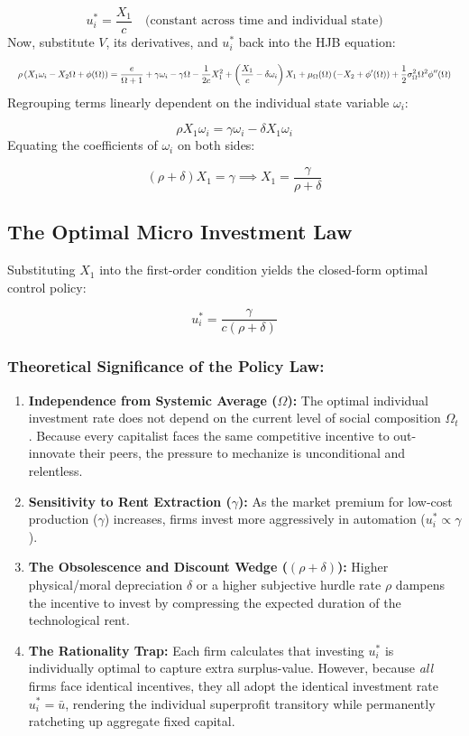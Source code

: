 \documentclass[11pt,letterpaper]{report}
\newcommand{\fitmath}[1]{\begingroup\setbox0=\hbox{$\displaystyle #1$}\ifdim\wd0>\linewidth\resizebox{\linewidth}{!}{$\displaystyle #1$}\else\displaystyle #1\fi\endgroup}
\begin{document}
\[
{u}_{i}^{*}=\frac{{X}_{1}}{c}\quad\text{(constant across time and individual state)}
\]
Now, substitute $V$, its derivatives, and ${u}_{i}^{*}$ back into the HJB equation:

\[\fitmath{\rho \left({{X}_{1}{\omega }_{i}-{X}_{2}\Omega +\phi (\Omega )}\right)=\frac{e}{\Omega +1}+\gamma {\omega }_{i}-\gamma \Omega -\frac{1}{2c}{X}_{1}^{2}+\left({\frac{{X}_{1}}{c}-\delta {\omega }_{i}}\right){X}_{1}+{\mu }_{\Omega }(\Omega )\left({-{X}_{2}+\phi '(\Omega )}\right)+\frac{1}{2}{\sigma }_{\Omega }^{2}{\Omega }^{2}\phi ''(\Omega )}\]
Regrouping terms linearly dependent on the individual state variable ${\omega }_{i}$:

\[
\rho {X}_{1}{\omega }_{i}=\gamma {\omega }_{i}-\delta {X}_{1}{\omega }_{i}
\]
Equating the coefficients of ${\omega }_{i}$ on both sides:

\[
(\rho + \delta) X_1 = \gamma \implies X_1 = \frac{\gamma}{\rho + \delta}
\]
\subsection{The Optimal Micro Investment Law}
Substituting ${X}_{1}$ into the first-order condition yields the closed-form optimal control policy:

\[
{u}_{i}^{*}=\frac{\gamma }{c(\rho +\delta )}
\]
\subsubsection{Theoretical Significance of the Policy Law:}
\begin{enumerate}
\item \textbf{Independence from Systemic Average ($\Omega$):} The optimal individual investment rate does not depend on the current level of social composition ${\Omega }_{t}$. Because every capitalist faces the same competitive incentive to out-innovate their peers, the pressure to mechanize is unconditional and relentless.
\item \textbf{Sensitivity to Rent Extraction ($\gamma$):} As the market premium for low-cost production ($\gamma$) increases, firms invest more aggressively in automation (${u}_{i}^{*}\propto \gamma$).
\item \textbf{The Obsolescence and Discount Wedge ($(\rho +\delta )$):} Higher physical/moral depreciation $\delta$ or a higher subjective hurdle rate $\rho$ dampens the incentive to invest by compressing the expected duration of the technological rent.
\item \textbf{The Rationality Trap:} Each firm calculates that investing ${u}_{i}^{*}$ is individually optimal to capture extra surplus-value. However, because \emph{all} firms face identical incentives, they all adopt the identical investment rate ${u}_{i}^{*}=\bar{u}$, rendering the individual superprofit transitory while permanently ratcheting up aggregate fixed capital.
\end{enumerate}
\end{document}
